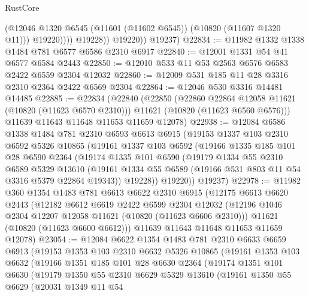 \begin{lexlean}{RustCore}
\begin{coremodule}
                      (@12046 @1320 @6545 (@11601 (@11602 @6545)) (@10820 (@11607 @1320 @11)))
                      @19220))))
              @19228))
          @19220))
      @19237)
@22834 := @11982 @1332 @1338 @1484 @781 @6577 @6586 @2310 @6917
@22840 := @12001 @1331 @54 @41 @6577 @6584 @2443
@22850 := @12010 @533 @11 @53 @2563 @6576 @6583 @2422 @6559 @2304 @12032
@22860 := @12009 @531 @185 @11 @28 @3316 @2310 @2364 @2422 @6569 @2304
@22864 := @12046 @530 @3316 @14481 @14485
@22885 := @22834
    (@22840
      (@22850
        (@22860 @22864 @12058 @11621 (@10820 (@11623 @6570 @2310)))
        @11621
        (@10820 (@11623 @6560 @6576)))
      @11639
      @11643
      @11648
      @11653
      @11659
      @12078)
@22938 := @12084
    @6586
    @1338
    @1484
    @781
    @2310
    @6593
    @6613
    @6915
    (@19153
      @1337
      @103
      @2310
      @6592
      @5326
      @10865
      (@19161
        @1337
        @103
        @6592
        (@19166
          @1335
          @185
          @101
          @28
          @6590
          @2364
          (@19174
            @1335
            @101
            @6590
            (@19179
              @1334
              @55
              @2310
              @6589
              @5329
              @13610
              (@19161 @1334 @55 @6589 (@19166 @531 @803 @11 @54 @3316 @5379 @22864 @19343))
              @19228))
          @19220))
      @19237)
@22978 := @11982
    @360
    @1354
    @1483
    @781
    @6613
    @6622
    @2310
    @6915
    (@12175
      @6613
      @6620
      @2443
      (@12182
        @6612
        @6619
        @2422
        @6599
        @2304
        @12032
        (@12196 @1046 @2304 @12207 @12058 @11621 (@10820 (@11623 @6606 @2310)))
        @11621
        (@10820 (@11623 @6600 @6612)))
      @11639
      @11643
      @11648
      @11653
      @11659
      @12078)
@23054 := @12084
    @6622
    @1354
    @1483
    @781
    @2310
    @6633
    @6659
    @6913
    (@19153
      @1353
      @103
      @2310
      @6632
      @5326
      @10865
      (@19161
        @1353
        @103
        @6632
        (@19166
          @1351
          @185
          @101
          @28
          @6630
          @2364
          (@19174
            @1351
            @101
            @6630
            (@19179
              @1350
              @55
              @2310
              @6629
              @5329
              @13610
              (@19161
                @1350
                @55
                @6629
                (@20031
                  @1349
                  @11
                  @54

\end{coremodule}
\end{lexlean}
